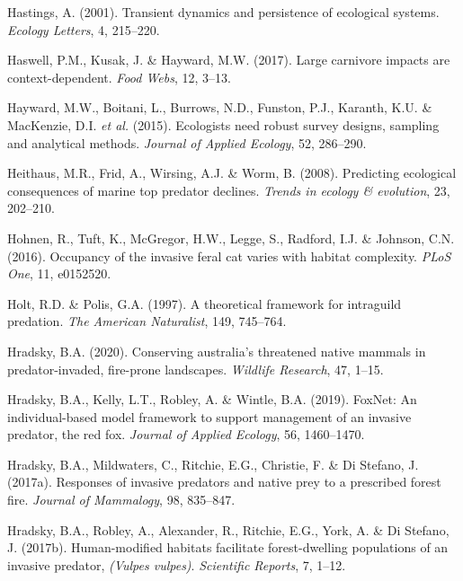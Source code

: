 \documentclass[11pt,a4paper,titlepage,twoside,openright]{style/unimelbthesis}
\begin{document}
\begin{mainmatter}
\leavevmode\hypertarget{ref-hastings2001transient}{}%
Hastings, A. (2001). Transient dynamics and persistence of ecological systems. \emph{Ecology Letters}, 4, 215--220.

\leavevmode\hypertarget{ref-haswell2017large}{}%
Haswell, P.M., Kusak, J. \& Hayward, M.W. (2017). Large carnivore impacts are context-dependent. \emph{Food Webs}, 12, 3--13.

\leavevmode\hypertarget{ref-hayward2015ecologists}{}%
Hayward, M.W., Boitani, L., Burrows, N.D., Funston, P.J., Karanth, K.U. \& MacKenzie, D.I. \emph{et al.} (2015). Ecologists need robust survey designs, sampling and analytical methods. \emph{Journal of Applied Ecology}, 52, 286--290.

\leavevmode\hypertarget{ref-heithaus2008predicting}{}%
Heithaus, M.R., Frid, A., Wirsing, A.J. \& Worm, B. (2008). Predicting ecological consequences of marine top predator declines. \emph{Trends in ecology \& evolution}, 23, 202--210.

\leavevmode\hypertarget{ref-hohnen2016occupancy}{}%
Hohnen, R., Tuft, K., McGregor, H.W., Legge, S., Radford, I.J. \& Johnson, C.N. (2016). Occupancy of the invasive feral cat varies with habitat complexity. \emph{PLoS One}, 11, e0152520.

\leavevmode\hypertarget{ref-holt1997theoretical}{}%
Holt, R.D. \& Polis, G.A. (1997). A theoretical framework for intraguild predation. \emph{The American Naturalist}, 149, 745--764.

\leavevmode\hypertarget{ref-hradsky2020conserving}{}%
Hradsky, B.A. (2020). Conserving australia's threatened native mammals in predator-invaded, fire-prone landscapes. \emph{Wildlife Research}, 47, 1--15.

\leavevmode\hypertarget{ref-hradsky2019foxnet}{}%
Hradsky, B.A., Kelly, L.T., Robley, A. \& Wintle, B.A. (2019). FoxNet: An individual-based model framework to support management of an invasive predator, the red fox. \emph{Journal of Applied Ecology}, 56, 1460--1470.

\leavevmode\hypertarget{ref-hradsky2017responses}{}%
Hradsky, B.A., Mildwaters, C., Ritchie, E.G., Christie, F. \& Di Stefano, J. (2017a). Responses of invasive predators and native prey to a prescribed forest fire. \emph{Journal of Mammalogy}, 98, 835--847.

\leavevmode\hypertarget{ref-hradsky2017human}{}%
Hradsky, B.A., Robley, A., Alexander, R., Ritchie, E.G., York, A. \& Di Stefano, J. (2017b). Human-modified habitats facilitate forest-dwelling populations of an invasive predator, \emph{(Vulpes vulpes)}. \emph{Scientific Reports}, 7, 1--12.


\end{mainmatter}
\end{document}
